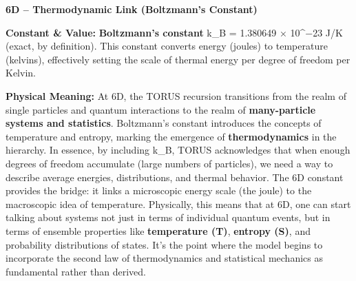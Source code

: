 \documentclass[]{article}
\begin{document}
\textbf{6D -- Thermodynamic Link (Boltzmann's Constant)}

\textbf{Constant \& Value:} \textbf{Boltzmann's constant} k\_B =
1.380649 × 10\^{}−23 J/K (exact, by definition)​. This constant converts
energy (joules) to temperature (kelvins), effectively setting the scale
of thermal energy per degree of freedom per Kelvin.

\textbf{Physical Meaning:} At 6D, the TORUS recursion transitions from
the realm of single particles and quantum interactions to the realm of
\textbf{many-particle systems and statistics}. Boltzmann's constant
introduces the concepts of temperature and entropy, marking the
emergence of \textbf{thermodynamics} in the hierarchy​. In essence, by
including k\_B, TORUS acknowledges that when enough degrees of freedom
accumulate (large numbers of particles), we need a way to describe
average energies, distributions, and thermal behavior. The 6D constant
provides the bridge: it links a microscopic energy scale (the joule) to
the macroscopic idea of temperature. Physically, this means that at 6D,
one can start talking about systems not just in terms of individual
quantum events, but in terms of ensemble properties like
\textbf{temperature (T)}, \textbf{entropy (S)}, and probability
distributions of states. It's the point where the model begins to
incorporate the second law of thermodynamics and statistical mechanics
as fundamental rather than derived.
\end{document}
